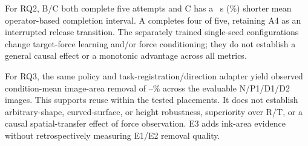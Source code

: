 For RQ2, B/C both complete five attempts and C has a \BCSeconds~s (\BCPercent\%) shorter mean operator-based completion interval. A completes four of five, retaining A4 as an interrupted release transition. The separately trained single-seed configurations change target-force learning and/or force conditioning; they do not establish a general causal effect or a monotonic advantage across all metrics.

For RQ3, the same policy and task-registration/direction adapter yield observed condition-mean image-area removal of \EthreeDtwoRemoval--\EthreeNRemoval\% across the evaluable N/P1/D1/D2 images. This supports reuse within the tested placements. It does not establish arbitrary-shape, curved-surface, or height robustness, superiority over R/T, or a causal spatial-transfer effect of force observation. E3 adds ink-area evidence without retrospectively measuring E1/E2 removal quality.
